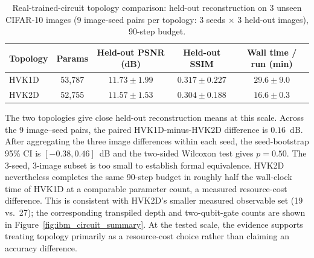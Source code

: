 \documentclass[11pt]{article}
\begin{document}
\begin{table}[H]
\centering
\caption{Real-trained-circuit topology comparison: held-out reconstruction on 3 unseen CIFAR-10 images (9 image-seed pairs per topology: 3 seeds $\times$ 3 held-out images), 90-step budget.}
\label{tab:topology_real_circuit}
\scriptsize
\begin{tabular}{lcccc}
\toprule
Topology & Params & Held-out PSNR (dB) & Held-out SSIM & Wall time / run (min) \\
\midrule
HVK1D & 53{,}787 & $11.73\pm1.99$ & $0.317\pm0.227$ & $29.6\pm9.0$ \\
HVK2D & 52{,}755 & $11.57\pm1.53$ & $0.304\pm0.188$ & $16.6\pm0.3$ \\
\bottomrule
\end{tabular}
\end{table}

The two topologies give close held-out reconstruction means at this scale. Across the 9 image--seed pairs, the paired HVK1D-minus-HVK2D difference is $0.16$~dB. After aggregating the three image differences within each seed, the seed-bootstrap 95\% CI is $[-0.38,0.46]$~dB and the two-sided Wilcoxon test gives $p=0.50$. The 3-seed, 3-image subset is too small to establish formal equivalence. HVK2D nevertheless completes the same 90-step budget in roughly half the wall-clock time of HVK1D at a comparable parameter count, a measured resource-cost difference. This is consistent with HVK2D's smaller measured observable set (19 vs.\ 27); the corresponding transpiled depth and two-qubit-gate counts are shown in Figure~\ref{fig:ibm_circuit_summary}. At the tested scale, the evidence supports treating topology primarily as a resource-cost choice rather than claiming an accuracy difference.
\end{document}
